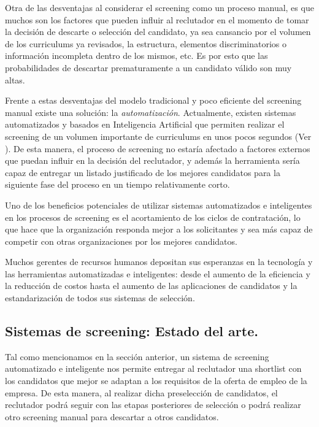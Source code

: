 \documentclass[12pt,a4paper]{article}
\begin{document}
\begin{sloppypar}
Otra de las desventajas al considerar el screening como un proceso manual, es que muchos son los factores que pueden influir al reclutador en el momento de tomar la decisión de descarte o selección del candidato, ya sea cansancio por el volumen de los curriculums ya revisados, la estructura, elementos discriminatorios o información incompleta dentro de los mismos, etc. Es por esto que las probabilidades de descartar prematuramente a un candidato válido son muy altas.

Frente a estas desventajas del modelo tradicional y poco eficiente del screening manual existe una solución: la \textit{automatización}. Actualmente, existen sistemas automatizados y basados en Inteligencia Artificial que permiten realizar el screening de un volumen importante de curriculums en unos pocos segundos (Ver \textit{}). De esta manera, el proceso de screening no estaría afectado a factores externos que puedan influir en la decisión del reclutador, y además la herramienta sería capaz de entregar un listado justificado de los mejores candidatos para la siguiente fase del proceso en un tiempo relativamente corto.

Uno de los beneficios potenciales de utilizar sistemas automatizados e inteligentes en los procesos de screening es el acortamiento de los ciclos de contratación, lo que hace que la organización responda mejor a los solicitantes y sea más capaz de competir con otras organizaciones por los mejores candidatos\cite{seleccion_reclutamiento_1}.  

Muchos gerentes de recursos humanos depositan sus esperanzas en la tecnología y las herramientas automatizadas e inteligentes: desde el aumento de la eficiencia y la reducción de costos hasta el aumento de las aplicaciones de candidatos y la estandarización de todos sus sistemas de selección\cite{seleccion_reclutamiento_1}.

\subsection{Sistemas de screening: Estado del arte.}\label{Estado_del_arte}

Tal como mencionamos en la sección anterior, un sistema de screening automatizado e inteligente nos permite entregar al reclutador una shortlist con los candidatos que mejor se adaptan a los requisitos de la oferta de empleo de la empresa. De esta manera, al realizar dicha preselección de candidatos, el reclutador podrá seguir con las etapas posteriores de selección o podrá realizar otro screening manual para descartar a otros candidatos.


\end{sloppypar}
\end{document}
